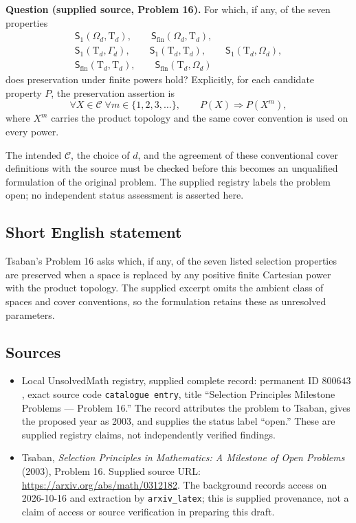 \documentclass[11pt]{article}
\begin{document}
\textbf{Question (supplied source, Problem 16).} For which, if any, of the seven properties
\[
\begin{gathered}
\mathsf S_1(\Omega_d,\mathrm T_d),\qquad
\mathsf S_{\mathrm{fin}}(\Omega_d,\mathrm T_d),\\
\mathsf S_1(\mathrm T_d,\Gamma_d),\qquad
\mathsf S_1(\mathrm T_d,\mathrm T_d),\qquad
\mathsf S_1(\mathrm T_d,\Omega_d),\\
\mathsf S_{\mathrm{fin}}(\mathrm T_d,\mathrm T_d),\qquad
\mathsf S_{\mathrm{fin}}(\mathrm T_d,\Omega_d)
\end{gathered}
\]
does preservation under finite powers hold? Explicitly, for each candidate property \(P\), the preservation assertion is
\[
\forall X\in\mathcal C\;\forall m\in\{1,2,3,\ldots\},\qquad
P(X)\Longrightarrow P(X^m),
\]
where \(X^m\) carries the product topology and the same cover convention is used on every power.

The intended \(\mathcal C\), the choice of \(d\), and the agreement of these conventional cover definitions with the source must be checked before this becomes an unqualified formulation of the original problem. The supplied registry labels the problem open; no independent status assessment is asserted here.
\subsection{Short English statement}
Tsaban's Problem 16 asks which, if any, of the seven listed selection properties are preserved when a space is replaced by any positive finite Cartesian power with the product topology. The supplied excerpt omits the ambient class of spaces and cover conventions, so the formulation retains these as unresolved parameters.
\subsection{Sources}
\begin{itemize}
\item Local UnsolvedMath registry, supplied complete record: permanent ID \(800643\), exact source code \texttt{catalogue entry}, title ``Selection Principles Milestone Problems --- Problem 16.'' The record attributes the problem to Tsaban, gives the proposed year as 2003, and supplies the status label ``open.'' These are supplied registry claims, not independently verified findings.
\item Tsaban, \emph{Selection Principles in Mathematics: A Milestone of Open Problems} (2003), Problem 16. Supplied source URL: \url{https://arxiv.org/abs/math/0312182}. The background records access on 2026-10-16 and extraction by \texttt{arxiv\_latex}; this is supplied provenance, not a claim of access or source verification in preparing this draft.
\end{itemize}
\end{document}
